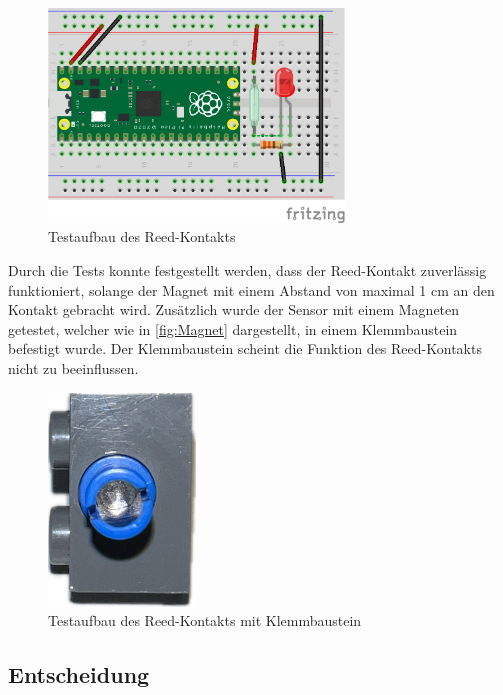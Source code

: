 \begin{figure}[H]
    \centering
    \includegraphics[width=0.7\textwidth]{Assets/Images/4-Entwicklung-der-GFA/Reed-Test1_bb.png}
    \caption{Testaufbau des Reed-Kontakts}\label{fig:Reed-Kontakt}
\end{figure}

Durch die Tests konnte festgestellt werden, dass der Reed-Kontakt zuverlässig funktioniert, solange der Magnet mit einem Abstand von maximal 1 cm an den Kontakt gebracht wird. Zusätzlich wurde der Sensor mit einem Magneten getestet, welcher wie in \autoref{fig:Magnet} dargestellt, in einem Klemmbaustein befestigt wurde. Der Klemmbaustein scheint die Funktion des Reed-Kontakts nicht zu beeinflussen.

\begin{figure}[H]
    \centering
    \includegraphics[width=0.35\textwidth]{Assets/Images/4-Entwicklung-der-GFA/Magnet.png}
    \caption{Testaufbau des Reed-Kontakts mit Klemmbaustein}\label{fig:Magnet}
\end{figure}

\subsection{Entscheidung}\label{text:Entwicklung-der-GFA:Achszähler:Entscheidung}

